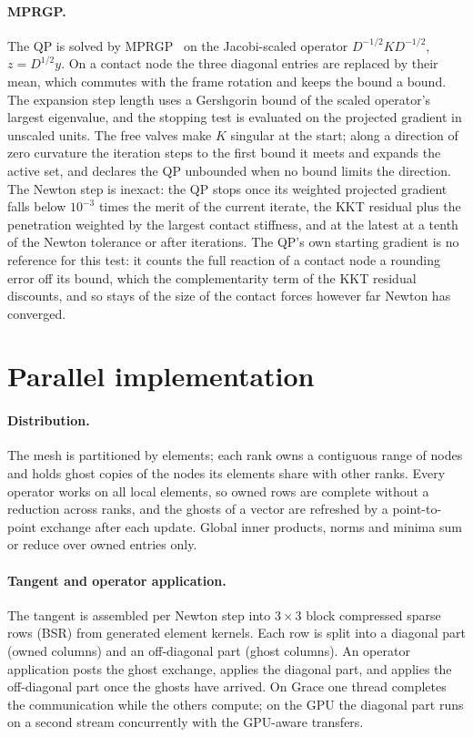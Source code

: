 \documentclass[sigconf,nonacm]{acmart}
\begin{document}
\paragraph{MPRGP.} The QP is solved by MPRGP~\cite{dostal2005mprgp,dostal2009} on the Jacobi-scaled
operator $D^{-1/2}KD^{-1/2}$, $z=D^{1/2}y$. On a contact node the three diagonal entries are
replaced by their mean, which commutes with the frame rotation and keeps the bound a bound. The
expansion step length uses a Gershgorin bound of the scaled operator's largest eigenvalue, and
the stopping test is evaluated on the projected gradient in unscaled units. The free valves make
$K$ singular at the start; along a direction of zero curvature the iteration steps to the first
bound it meets and expands the active set, and declares the QP unbounded when no bound limits the
direction. The Newton step is inexact: the QP stops once its weighted projected gradient falls
below $10^{-3}$ times the merit of the current iterate, the KKT residual plus the penetration
weighted by the largest contact stiffness, and at the latest at a tenth of the Newton tolerance or
after \qpCap{} iterations. The QP's own starting gradient is no reference for this test: it counts
the full reaction of a contact node a rounding error off its bound, which the complementarity term
of the KKT residual discounts, and so stays of the size of the contact forces however far Newton
has converged.

\section{Parallel implementation}
\label{sec:parallel}

\paragraph{Distribution.} The mesh is partitioned by elements; each rank owns a contiguous range of
nodes and holds ghost copies of the nodes its elements share with other ranks. Every operator
works on all local elements, so owned rows are complete without a reduction across ranks, and the
ghosts of a vector are refreshed by a point-to-point exchange after each update. Global inner
products, norms and minima sum or reduce over owned entries only.

\paragraph{Tangent and operator application.} The tangent is assembled per Newton step into
$3\times3$ block compressed sparse rows (BSR) from generated element kernels. Each row is split
into a diagonal part (owned columns) and an off-diagonal part (ghost columns). An operator
application posts the ghost exchange, applies the diagonal part, and applies the off-diagonal
part once the ghosts have arrived. On Grace one thread completes the communication while the
others compute; on the GPU the diagonal part runs on a second stream concurrently with the
GPU-aware transfers.
\end{document}
